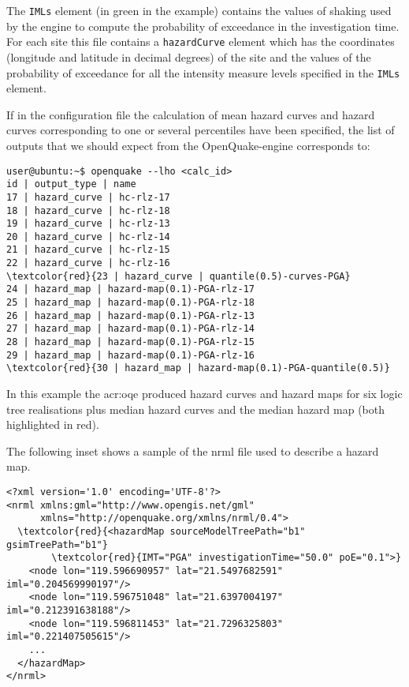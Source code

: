 The \texttt{IMLs} element (in green in the example) contains the 
values of shaking used by the engine to compute the probability of 
exceedance in the investigation time.
For each site this file contains a \texttt{hazardCurve} element which 
has the coordinates (longitude and latitude in decimal degrees) 
of the site and the values of the probability of exceedance for all the 
intensity measure levels specified in the \texttt{IMLs} element.

If in the configuration file the calculation of mean hazard curves 
and hazard curves corresponding to one or several percentiles have 
been specified, the list of outputs that we should expect from the 
OpenQuake-engine corresponds to:
\begin{Verbatim}[frame=single, commandchars=\\\{\}, fontsize=\small]
user@ubuntu:~$ openquake --lho <calc_id> 
id | output_type | name
17 | hazard_curve | hc-rlz-17
18 | hazard_curve | hc-rlz-18
19 | hazard_curve | hc-rlz-13
20 | hazard_curve | hc-rlz-14
21 | hazard_curve | hc-rlz-15
22 | hazard_curve | hc-rlz-16
\textcolor{red}{23 | hazard_curve | quantile(0.5)-curves-PGA}
24 | hazard_map | hazard-map(0.1)-PGA-rlz-17
25 | hazard_map | hazard-map(0.1)-PGA-rlz-18
26 | hazard_map | hazard-map(0.1)-PGA-rlz-13
27 | hazard_map | hazard-map(0.1)-PGA-rlz-14
28 | hazard_map | hazard-map(0.1)-PGA-rlz-15
29 | hazard_map | hazard-map(0.1)-PGA-rlz-16
\textcolor{red}{30 | hazard_map | hazard-map(0.1)-PGA-quantile(0.5)}
\end{Verbatim}
In this example the \gls{acr:oqe} produced hazard curves and hazard maps for 
six logic tree realisations plus median hazard curves 
and the median hazard map (both highlighted in red).

The following inset shows a sample of the nrml file used 
to describe a hazard map.
\begin{Verbatim}[frame=single, commandchars=\\\{\}, fontsize=\small]
<?xml version='1.0' encoding='UTF-8'?>
<nrml xmlns:gml="http://www.opengis.net/gml" 
      xmlns="http://openquake.org/xmlns/nrml/0.4">
  \textcolor{red}{<hazardMap sourceModelTreePath="b1" gsimTreePath="b1"}
        \textcolor{red}{IMT="PGA" investigationTime="50.0" poE="0.1">}
    <node lon="119.596690957" lat="21.5497682591" iml="0.204569990197"/>
    <node lon="119.596751048" lat="21.6397004197" iml="0.212391638188"/>
    <node lon="119.596811453" lat="21.7296325803" iml="0.221407505615"/>
    ...
  </hazardMap>
</nrml>
\end{Verbatim}
